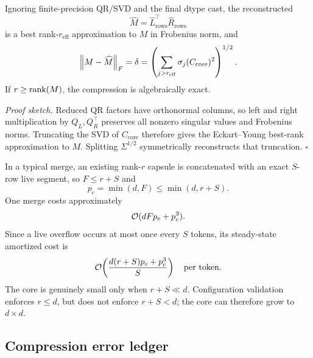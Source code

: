 \begin{proposition}
\label{prop:best-rank}
Ignoring finite-precision QR/SVD and the final dtype cast, the reconstructed
\begin{equation}
  \widehat M
  =
  \widehat L_{\mathrm{rows}}^\top
  \widehat R_{\mathrm{rows}}
\end{equation}
is a best rank-\(r_{\mathrm{eff}}\) approximation to \(M\) in Frobenius norm,
and
\begin{equation}
  \left\lVert M-\widehat M\right\rVert_F
  =
  \delta
  =
  \left(
    \sum_{j>r_{\mathrm{eff}}}\sigma_j(C_{\mathrm{core}})^2
  \right)^{1/2}.
  \label{eq:discarded-tail}
\end{equation}
If \(r\geq\operatorname{rank}(M)\), the compression is algebraically exact.
\end{proposition}
\noindent\emph{Proof sketch.}
Reduced QR factors have orthonormal columns, so left and right multiplication
by \(Q_L,Q_R^\top\) preserves all nonzero singular values and Frobenius norms.
Truncating the SVD of \(C_{\mathrm{core}}\) therefore gives the
Eckart--Young best-rank approximation to \(M\).  Splitting
\(\Sigma^{1/2}\) symmetrically reconstructs that truncation.
\hfill\(\square\)

In a typical merge, an existing rank-\(r\) capsule is concatenated with an
exact \(S\)-row live segment, so \(F\leq r+S\) and
\begin{equation}
  p_c=\min(d,F)\leq\min(d,r+S).
\end{equation}
One merge costs approximately
\begin{equation}
  \mathcal{O}(dFp_c+p_c^3).
  \label{eq:compression-merge-cost}
\end{equation}
Since a live overflow occurs at most once every \(S\) tokens, its steady-state
amortized cost is
\begin{equation}
  \mathcal{O}\!\left(
    \frac{d(r+S)p_c+p_c^3}{S}
  \right)
  \quad\text{per token}.
  \label{eq:compression-amortized-cost}
\end{equation}
The core is genuinely small only when \(r+S\ll d\).  Configuration validation
enforces \(r\leq d\), but does not enforce \(r+S<d\); the core can therefore
grow to \(d\times d\).

\subsection{Compression error ledger}
\label{subsec:error-ledger}

